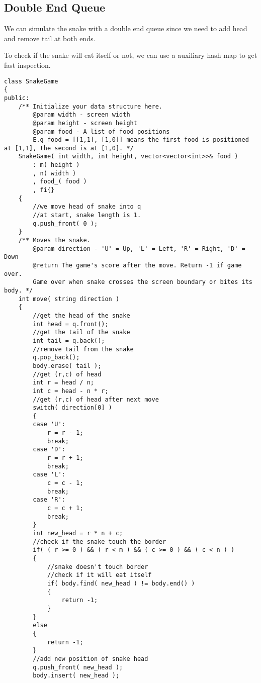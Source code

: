 \subsection{Double End Queue}
We can simulate the snake with a double end queue since we need to add head and remove tail at both ends.

To check if the snake will eat itself or not, we can use a auxiliary hash map to get fast inspection.

\setcounter{lstlisting}{0}
\begin{lstlisting}[style=customc, caption={Queue}]
class SnakeGame
{
public:
    /** Initialize your data structure here.
        @param width - screen width
        @param height - screen height
        @param food - A list of food positions
        E.g food = [[1,1], [1,0]] means the first food is positioned at [1,1], the second is at [1,0]. */
    SnakeGame( int width, int height, vector<vector<int>>& food )
        : m( height )
        , n( width )
        , food_( food )
        , fi{}
    {
        //we move head of snake into q
        //at start, snake length is 1.
        q.push_front( 0 );
    }
    /** Moves the snake.
        @param direction - 'U' = Up, 'L' = Left, 'R' = Right, 'D' = Down
        @return The game's score after the move. Return -1 if game over.
        Game over when snake crosses the screen boundary or bites its body. */
    int move( string direction )
    {
        //get the head of the snake
        int head = q.front();
        //get the tail of the snake
        int tail = q.back();
        //remove tail from the snake
        q.pop_back();
        body.erase( tail );
        //get (r,c) of head
        int r = head / n;
        int c = head - n * r;
        //get (r,c) of head after next move
        switch( direction[0] )
        {
        case 'U':
            r = r - 1;
            break;
        case 'D':
            r = r + 1;
            break;
        case 'L':
            c = c - 1;
            break;
        case 'R':
            c = c + 1;
            break;
        }
        int new_head = r * n + c;
        //check if the snake touch the border
        if( ( r >= 0 ) && ( r < m ) && ( c >= 0 ) && ( c < n ) )
        {
            //snake doesn't touch border
            //check if it will eat itself
            if( body.find( new_head ) != body.end() )
            {
                return -1;
            }
        }
        else
        {
            return -1;
        }
        //add new position of snake head
        q.push_front( new_head );
        body.insert( new_head );

\end{lstlisting}

